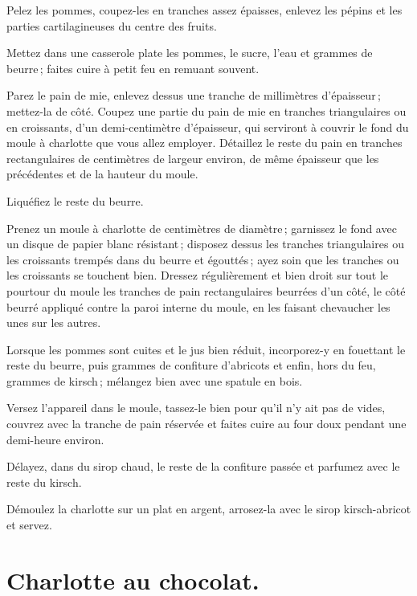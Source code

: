 Pelez les pommes, coupez-les en tranches assez épaisses, enlevez les pépins et
les parties cartilagineuses du centre des fruits.

Mettez dans une casserole plate les pommes, le sucre, l'eau et {\mmm}
grammes de beurre ; faites cuire à petit feu en remuant souvent.

Parez le pain de mie, enlevez dessus une tranche de {\mmm} millimètres
d'épaisseur ; mettez-la de côté. Coupez une partie du pain de mie en tranches
triangulaires ou en croissants, d'un demi-centimètre d'épaisseur, qui serviront
à couvrir le fond du moule à charlotte que vous allez employer. Détaillez le
reste du pain en tranches rectangulaires de {\mmm} centimètres de largeur
environ, de même épaisseur que les précédentes et de la hauteur du moule.

Liquéfiez le reste du beurre.

Prenez un moule à charlotte de {\mmm} centimètres de diamètre ; garnissez
le fond avec un disque de papier blanc résistant ; disposez dessus les tranches
triangulaires ou les croissants trempés dans du beurre et égouttés ; ayez soin
que les tranches ou les croissants se touchent bien. Dressez régulièrement et
bien droit sur tout le pourtour du moule les tranches de pain rectangulaires
beurrées d'un côté, le côté beurré appliqué contre la paroi interne du moule,
en les faisant chevaucher les unes sur les autres.

Lorsque les pommes sont cuites et le jus bien réduit, incorporez-y en fouettant
le reste du beurre, puis {\mmm} grammes de confiture d'abricots et
enfin, hors du feu, {\mmm} grammes de kirsch ; mélangez bien avec une
spatule en bois.

Versez l'appareil dans le moule, tassez-le bien pour qu'il n'y ait pas de
vides, couvrez avec la tranche de pain réservée et faites cuire au four doux
pendant une demi-heure environ.

Délayez, dans du sirop chaud, le reste de la confiture passée et parfumez avec le
reste du kirsch.

Démoulez la charlotte sur un plat en argent, arrosez-la avec le sirop
kirsch-abricot et servez.

\section*{\centering Charlotte au chocolat.}
{}

